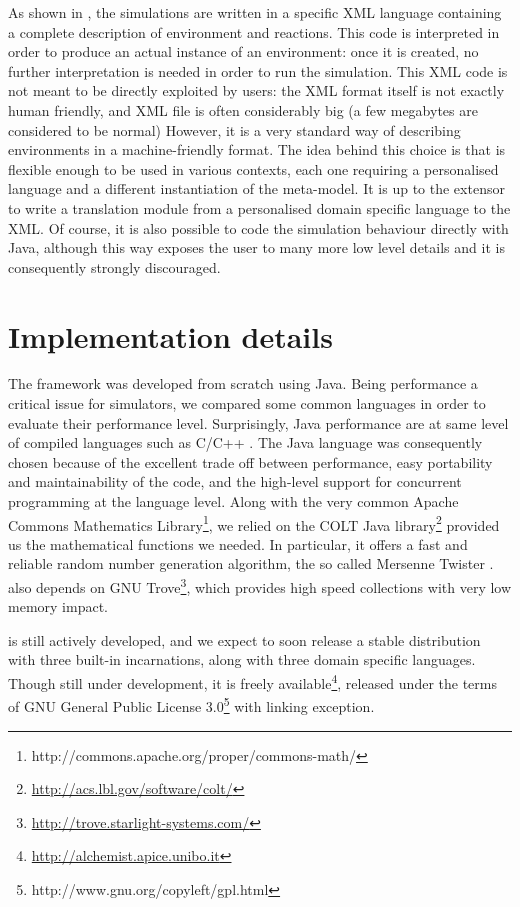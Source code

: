 \documentclass[12pt,a4paper,twoside,openright]{book}
\begin{document}
As shown in , the simulations are written in a specific XML language containing a complete description of environment and reactions.
%
This code is interpreted in order to produce an actual instance of an environment: once it is created, no further interpretation is needed in order to run the simulation.
%
This XML code is not meant to be directly exploited by users: the XML format itself is not exactly human friendly, and XML file is often considerably big (a few megabytes are considered to be normal)
%
However, it is a very standard way of describing environments in a machine-friendly format.
%
The idea behind this choice is that \alchemist{} is flexible enough to be used in various contexts, each one requiring a personalised language and a different instantiation of the meta-model.
%
It is up to the extensor to write a translation module from a personalised domain specific language to the \alchemist{} XML.
%
Of course, it is also possible to code the simulation behaviour directly with Java, although this way exposes the user to many more low level details and it is consequently strongly discouraged.

\section{Implementation details}

The framework was developed from scratch using Java. Being performance a critical issue for simulators, we compared some common languages in order to evaluate their performance level.
%
Surprisingly, Java performance are at same level of compiled languages such as C/C++ \cite{bull2003, oancea2011}.
%
The Java language was consequently chosen because of the excellent trade off between performance, easy portability and maintainability of the code, and the high-level support for concurrent programming at the language level. 
%
Along with the very common Apache Commons Mathematics Library\footnote{http://commons.apache.org/proper/commons-math/}, we relied on the COLT Java library\footnote{\url{http://acs.lbl.gov/software/colt/}} provided us the mathematical functions we needed.
%
In particular, it offers a fast and reliable random number generation algorithm, the so called Mersenne Twister \cite{matsumoto1998}.
%
\alchemist{} also depends on GNU Trove\footnote{\url{http://trove.starlight-systems.com/}}, which provides high speed collections with very low memory impact.

\alchemist{} is still actively developed, and we expect to soon release a stable distribution with three built-in incarnations, along with three domain specific languages.
%
Though still under development, it is freely available\footnote{\url{http://alchemist.apice.unibo.it}}, released under the terms of GNU General Public License 3.0\footnote{http://www.gnu.org/copyleft/gpl.html} with linking exception.
\end{document}
